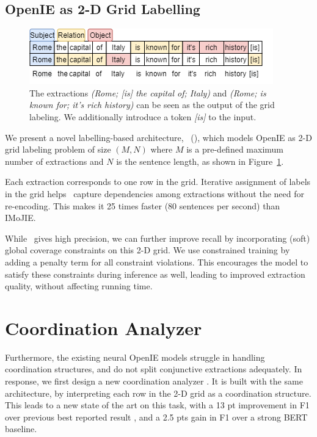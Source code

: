     \subsection{OpenIE as 2-D Grid Labelling}

        \begin{figure}[h]
            \centering
            \includegraphics[width=0.8\hsize]{images/mlil/openie_example.png}
            \vspace*{-4ex}
            \caption{The extractions \textit{(Rome; [is] the capital of; Italy)} and \textit{(Rome; is known for; it's rich history)} can be seen as the output of the grid labeling. We additionally introduce a token \textit{[is]} to the input.}
            \label{fig:grid_example}
        \end{figure}

        We present a novel labelling-based architecture, \mlilboldlongname~(\mlilboldshortname), which models OpenIE as 2-D grid labeling problem of size $(M, N)$ where $M$ is a pre-defined maximum number of extractions and $N$ is the sentence length, as shown in Figure~\ref{fig:grid_example}.

        Each extraction corresponds to one row in the grid. Iterative assignment of labels in the grid helps \mlilshortname\ capture dependencies among extractions without the need for re-encoding. This makes it 25 times faster (80 sentences per second) than IMoJIE.

        While \mlilshortname\ gives high precision, we can further improve recall by incorporating (soft) global coverage constraints on this 2-D grid. We use constrained training \citep{mehta&al18} by adding a penalty term for all constraint violations. This encourages the model to satisfy these constraints during inference as well, leading to improved extraction quality, without affecting running time.


\section{Coordination Analyzer}

    Furthermore, the existing neural OpenIE models struggle in handling coordination structures, and do not split conjunctive extractions adequately. In response, we first design a new coordination analyzer \citep{ficler&goldberg16b}. It is built with the same \mlilshortname~ architecture, by interpreting each row in the 2-D grid as a coordination structure. This leads to a new state of the art on this task, with a 13 pt improvement in F1 over previous best reported result \citep{teranishi+19}, and a 2.5 pts gain in F1 over a strong BERT baseline. 

